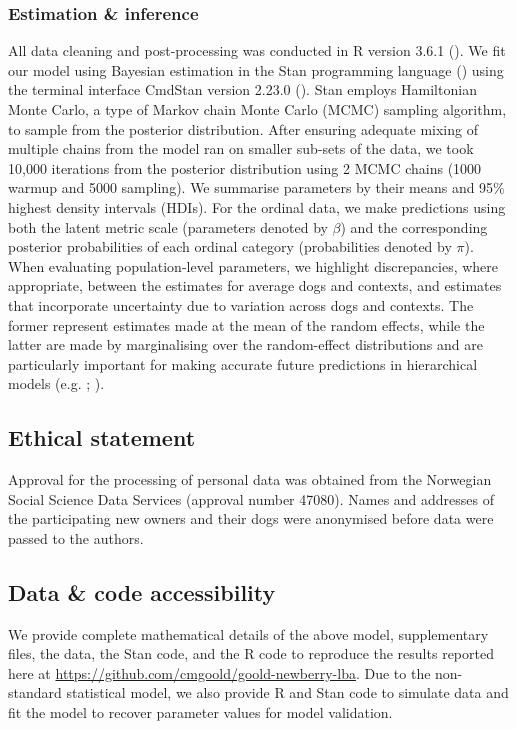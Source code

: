 \documentclass[12pt]{article}
\begin{document}
\subsubsection{Estimation \& inference}
All data cleaning and post-processing was conducted in R version 3.6.1 (\cite{rcoreteam2019}). We fit our model using Bayesian estimation in the Stan programming language (\cite{stan2018}) using the terminal interface CmdStan version 2.23.0 (\cite{cmdstan2018}). Stan employs Hamiltonian Monte Carlo, a type of Markov chain Monte Carlo (MCMC) sampling algorithm, to sample from the posterior distribution. After ensuring adequate mixing of multiple chains from the model ran on smaller sub-sets of the data, we took 10,000 iterations from the posterior distribution using 2 MCMC chains (1000 warmup and 5000 sampling). We summarise parameters by their means and 95\% highest density intervals (HDIs). For the ordinal data, we make predictions using both the latent metric scale (parameters denoted by $\beta$) and the corresponding posterior probabilities of each ordinal category (probabilities denoted by $\pi$). When evaluating population-level parameters, we highlight discrepancies, where appropriate, between the estimates for average dogs and contexts, and estimates that incorporate uncertainty due to variation across dogs and contexts. The former represent estimates made at the mean of the random effects, while the latter are made by marginalising over the random-effect distributions and are particularly important for making accurate future predictions in hierarchical models (e.g. \cite{inthout2016}; \cite{wang2019}).

\subsection{Ethical statement}
Approval for the processing of personal data was obtained from the Norwegian Social Science Data Services (approval number 47080). Names and addresses of the participating new owners and their dogs were anonymised before data were passed to the authors.

\subsection{Data \& code accessibility}
We provide complete mathematical details of the above model, supplementary files, the data, the Stan code, and the R code to reproduce the results reported here at  \url{https://github.com/cmgoold/goold-newberry-lba}. Due to the non-standard statistical model, we also provide R and Stan code to simulate data and fit the model to recover parameter values for model validation.
\end{document}
